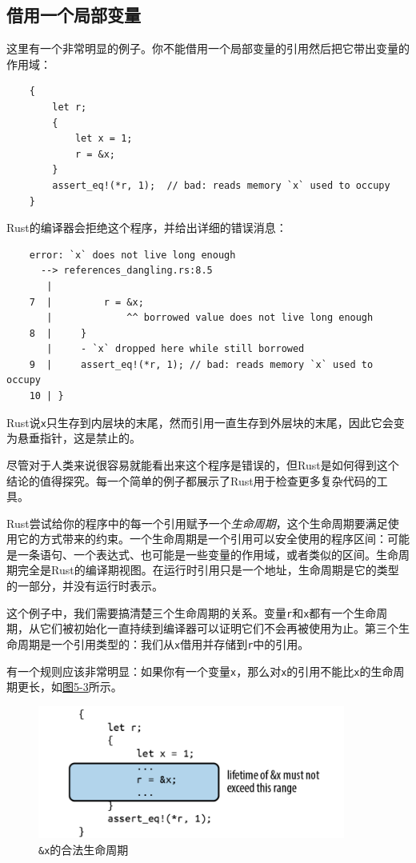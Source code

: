 \subsection{借用一个局部变量}

这里有一个非常明显的例子。你不能借用一个局部变量的引用然后把它带出变量的作用域：
\begin{verbatim}
    {
        let r;
        {
            let x = 1;
            r = &x;
        }
        assert_eq!(*r, 1);  // bad: reads memory `x` used to occupy
    }
\end{verbatim}

Rust的编译器会拒绝这个程序，并给出详细的错误消息：
\begin{verbatim}
    error: `x` does not live long enough
      --> references_dangling.rs:8.5
       |
    7  |         r = &x;
       |             ^^ borrowed value does not live long enough
    8  |     }
       |     - `x` dropped here while still borrowed
    9  |     assert_eq!(*r, 1); // bad: reads memory `x` used to occupy
    10 | }
\end{verbatim}

Rust说\texttt{x}只生存到内层块的末尾，然而引用一直生存到外层块的末尾，因此它会变为悬垂指针，这是禁止的。

尽管对于人类来说很容易就能看出来这个程序是错误的，但Rust是如何得到这个结论的值得探究。每一个简单的例子都展示了Rust用于检查更多复杂代码的工具。

Rust尝试给你的程序中的每一个引用赋予一个\emph{生命周期}，这个生命周期要满足使用它的方式带来的约束。一个生命周期是一个引用可以安全使用的程序区间：可能是一条语句、一个表达式、也可能是一些变量的作用域，或者类似的区间。生命周期完全是Rust的编译期视图。在运行时引用只是一个地址，生命周期是它的类型的一部分，并没有运行时表示。

这个例子中，我们需要搞清楚三个生命周期的关系。变量\texttt{r}和\texttt{x}都有一个生命周期，从它们被初始化一直持续到编译器可以证明它们不会再被使用为止。第三个生命周期是一个引用类型的：我们从\texttt{x}借用并存储到\texttt{r}中的引用。

有一个规则应该非常明显：如果你有一个变量\texttt{x}，那么对\texttt{x}的引用不能比\texttt{x}的生命周期更长，如\hyperref[f5-3]{图5-3}所示。

\begin{figure}[htbp]
    \centering
    \includegraphics[width=0.9\textwidth]{../img/f5-3.png}
    \caption{\texttt{\&x}的合法生命周期}
    \label{f5-3}
\end{figure}

